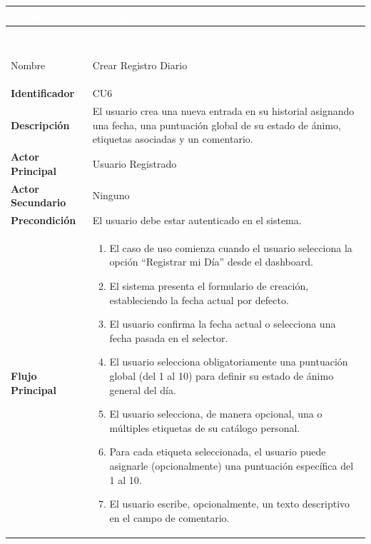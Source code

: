 \begingroup
\small 
\renewcommand{\arraystretch}{1.4}
\begin{xltabular}{\textwidth}{|>{\bfseries}p{3.5cm}|X|}
    \textcolor{white}{Campo} & \textcolor{white}{Descripción} \\ \hline
    \endfirsthead

     \\
    \hline
    \textcolor{white}{Campo} & \textcolor{white}{Descripción} \\ \hline
    \endhead

    Nombre & Crear Registro Diario \\ \hline
    Identificador & CU6 \\ \hline
    Descripción & El usuario crea una nueva entrada en su historial asignando una fecha, una puntuación global de su estado de ánimo, etiquetas asociadas y un comentario. \\ \hline
    Actor Principal & Usuario Registrado \\ \hline
    Actor Secundario & Ninguno \\ \hline
    Precondición & El usuario debe estar autenticado en el sistema. \\ \hline
    Flujo Principal & 
    \begin{enumerate}[leftmargin=0.5cm, topsep=0pt, partopsep=0pt, parsep=0pt, itemsep=4pt]
        \item El caso de uso comienza cuando el usuario selecciona la opción ``Registrar mi Día'' desde el dashboard.
        \item El sistema presenta el formulario de creación, estableciendo la fecha actual por defecto.
        \item El usuario confirma la fecha actual o selecciona una fecha pasada en el selector.
        \item El usuario selecciona obligatoriamente una puntuación global (del 1 al 10) para definir su estado de ánimo general del día.
        \item El usuario selecciona, de manera opcional, una o múltiples etiquetas de su catálogo personal.
        \item Para cada etiqueta seleccionada, el usuario puede asignarle (opcionalmente) una puntuación específica del 1 al 10.
        \item El usuario escribe, opcionalmente, un texto descriptivo en el campo de comentario.

\end{enumerate}
\end{xltabular}
